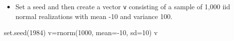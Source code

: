 \documentclass[
]{article}
\newenvironment{Shaded}{\begin{snugshade}}{\end{snugshade}}
\newcommand{\AttributeTok}[1]{\textcolor[rgb]{0.77,0.63,0.00}{#1}}
\newcommand{\DecValTok}[1]{\textcolor[rgb]{0.00,0.00,0.81}{#1}}
\newcommand{\FunctionTok}[1]{\textcolor[rgb]{0.00,0.00,0.00}{#1}}
\newcommand{\NormalTok}[1]{#1}
\newcommand{\OtherTok}[1]{\textcolor[rgb]{0.56,0.35,0.01}{#1}}
\newcommand{\SpecialCharTok}[1]{\textcolor[rgb]{0.00,0.00,0.00}{#1}}
\providecommand{\tightlist}{%
  \setlength{\itemsep}{0pt}\setlength{\parskip}{0pt}}
\begin{document}
\begin{itemize}
\tightlist
\item
  Set a seed and then create a vector \texttt{v} consisting of a sample
  of 1,000 iid normal realizations with mean -10 and variance 100.
\end{itemize}

\begin{Shaded}
\begin{Highlighting}[]
\FunctionTok{set.seed}\NormalTok{(}\DecValTok{1984}\NormalTok{)}
\NormalTok{v}\OtherTok{=}\FunctionTok{rnorm}\NormalTok{(}\DecValTok{1000}\NormalTok{, }\AttributeTok{mean=}\SpecialCharTok{{-}}\DecValTok{10}\NormalTok{, }\AttributeTok{sd=}\DecValTok{10}\NormalTok{)}
\NormalTok{v}
\end{Highlighting}
\end{Shaded}
\end{document}
